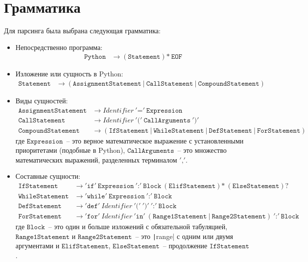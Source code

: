 \documentclass[12pt, a4paper, oneside, final]{article}
\begin{document}
	\section{Грамматика}
	Для парсинга была выбрана следующая грамматика:
	\begin{itemize}
		\item Непосредственно программа:
		\begin{align*}
			\mathtt{Python} &\to (\mathtt{Statement})\texttt{*}~\mathtt{EOF}
		\end{align*}
		\item Изложение или сущность в Python:
		\begin{align*}
			\mathtt{Statement} &\to (\mathtt{AssignmentStatement}~\texttt{|}~\mathtt{CallStatement}~\texttt{|}~\mathtt{CompoundStatement})
		\end{align*}
		\item Виды сущностей:
		\begin{align*}
			\mathtt{AssignmentStatement} &\to \mathit{Identifier}~'\texttt{=}'~\mathtt{Expression} \\
			\mathtt{CallStatement} &\to \mathit{Identifier}~'\texttt{(}'~\mathtt{CallArguments}~'\texttt{)}' \\
			\mathtt{CompoundStatement} &\to (\mathtt{IfStatement}~\texttt{|}~\mathtt{WhileStatement}~\texttt{|}~\mathtt{DefStatement}~\texttt{|}~\mathtt{ForStatement})
		\end{align*}
		где $\mathtt{Expression}$~-- это верное математическое выражение с установленными приоритетами (подобные в Python), $\mathtt{CallArguments}$~-- это множество математических выражений, разделенных терминалом $'\texttt{,}'$.
		\item Составные сущности:
		\begin{align*}
			\mathtt{IfStatement} &\to '\texttt{if}'~\mathtt{Expression}~'\texttt{:}'~\mathtt{Block}~(\mathtt{ElifStatement})\texttt{*}~(\mathtt{ElseStatement})\texttt{?} \\
			\mathtt{WhileStatement} &\to '\texttt{while}'~\mathtt{Expression}~'\texttt{:}'~\mathtt{Block} \\
			\mathtt{DefStatement} &\to '\texttt{def}'~\mathit{Identifier}~'\texttt{(}'~'\texttt{)}'~'\texttt{:}'~\mathtt{Block} \\
			\mathtt{ForStatement} &\to '\texttt{for}'~\mathit{Identifier}~'\texttt{in}'~(\mathtt{Range1Statement}~\texttt{|}~\mathtt{Range2Statement})~'\texttt{:}'~\mathtt{Block}
		\end{align*}
		где $\mathtt{Block}$~-- это один и больше изложений с обязательной табуляцией, $\mathtt{Range1Statement}$ и $\mathtt{Range2Statement}$~-- это \texttt|range| с одним или двумя аргументами и $\mathtt{ElifStatement}$, $\mathtt{ElseStatement}$~-- продолжение $\mathtt{IfStatement}$.
	\end{itemize}
\end{document}
